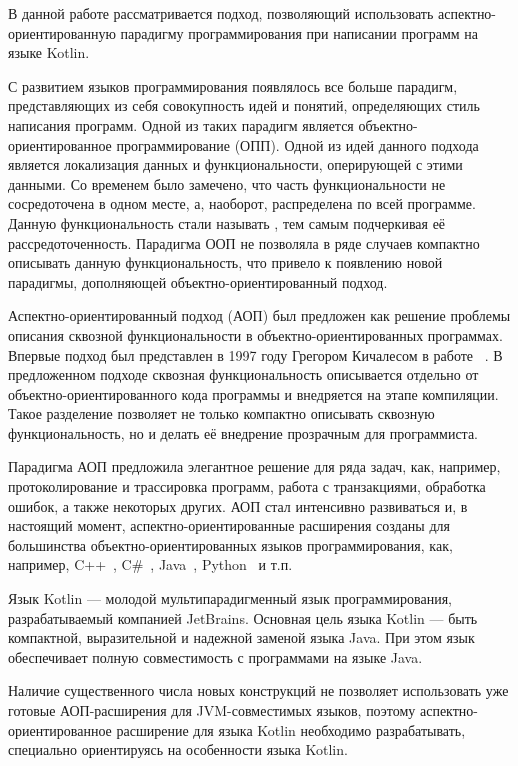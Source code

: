 \intro

В данной работе рассматривается подход, позволяющий использовать аспектно-ориентированную парадигму программирования при написании программ на языке Kotlin.

С развитием языков программирования появлялось все больше парадигм, представляющих из себя совокупность идей и понятий, определяющих стиль написания программ.
Одной из таких парадигм является объектно-ориентированное программирование (ОПП).
Одной из идей данного подхода является локализация данных и функциональности, оперирующей с этими данными.
Со временем было замечено, что часть функциональности не сосредоточена в одном месте, а, наоборот, распределена по всей программе.
Данную функциональность стали называть , тем самым подчеркивая её рассредоточенность.
Парадигма ООП не позволяла в ряде случаев компактно описывать данную функциональность, что привело к появлению новой парадигмы, дополняющей объектно-ориентированный подход.

Аспектно-ориентированный подход (АОП) был предложен как решение проблемы
описания сквозной функциональности в объектно-ориентированных программах.
Впервые подход был представлен в 1997 году Грегором Кичалесом в работе
~\cite{kiczales_aop}.
В предложенном подходе сквозная функциональность описывается отдельно от
объектно-ориентированного кода программы и внедряется на этапе компиляции.
Такое разделение позволяет не только компактно описывать сквозную 
функциональность, но и делать её внедрение прозрачным для программиста.

Парадигма АОП предложила элегантное решение для ряда задач, как, например, 
протоколирование и трассировка программ, работа с транзакциями, обработка
ошибок, а также некоторых других.
АОП стал интенсивно развиваться и, в настоящий момент, аспектно-ориентированные
расширения созданы для большинства объектно-ориентированных языков
программирования, как, например, C++~\cite{aspectC_homepage},
C\#~\cite{postsharp_doc}, Java~\cite{aspectj_doc,springAOP_doc},
Python~\cite{spring_python} и т.п.

Язык Kotlin --- молодой мультипарадигменный язык программирования,
разрабатываемый компанией JetBrains.
Основная цель языка Kotlin --- быть компактной, выразительной и надежной заменой
языка Java.
При этом язык обеспечивает полную совместимость с программами на языке
Java.

Наличие существенного числа новых конструкций не позволяет использовать уже 
готовые АОП-расширения для JVM-совместимых языков, поэтому
аспектно-ориентированное  расширение для языка Kotlin необходимо разрабатывать,
специально ориентируясь на особенности языка Kotlin.